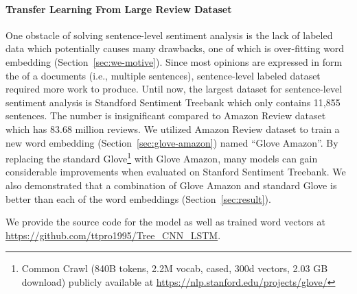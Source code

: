 \paragraph{Transfer Learning From Large Review Dataset} One obstacle of solving sentence-level sentiment analysis is the lack of labeled data which potentially causes many drawbacks, one of which is over-fitting word embedding (Section~\ref{sec:we-motive}).
Since most opinions are expressed in form the of  a documents (i.e., multiple sentences), sentence-level labeled dataset required more work to produce.
Until now, the largest dataset for sentence-level sentiment analysis is Standford Sentiment Treebank which only contains 11,855 sentences.
The number is insignificant compared to Amazon Review dataset which has 83.68 million reviews.
We utilized Amazon Review dataset to train a new word embedding (Section~\ref{sec:glove-amazon}) named ``Glove Amazon''.
By replacing the standard Glove\footnote{Common Crawl (840B tokens, 2.2M vocab, cased, 300d vectors, 2.03 GB download) publicly available at \url{https://nlp.stanford.edu/projects/glove/}} with Glove Amazon, many models can gain considerable improvements when evaluated on Stanford Sentiment Treebank.
We also demonstrated that a combination of Glove Amazon and standard Glove is better than each of the word embeddings (Section~\ref{sec:result}).

We provide the source code for the model as well as trained word vectors at \url{https://github.com/ttpro1995/Tree_CNN_LSTM}.
